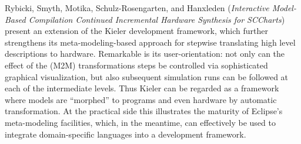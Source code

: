 



Rybicki, Smyth, Motika,
Schulz-Rosengarten, and Hanxleden
\cite{isola-2016-rybicki}
({\em Interactive Model-Based Compilation Continued
Incremental Hardware Synthesis for SCCharts})
present an extension of the Kieler development framework, which further strengthens its meta-modeling-based approach for stepwise translating high level descriptions to hardware. Remarkable is its user-orientation: not only can the effect of the (M2M) transformations steps be controlled via sophisticated graphical visualization, but also subsequent simulation runs can be followed at each of the intermediate levels. Thus Kieler can be regarded as a framework where models are ``morphed'' to programs and even hardware  by automatic transformation. 
At the practical side this illustrates the maturity of Eclipse's meta-modeling facilities, which, in the meantime, can effectively be used to integrate domain-specific languages into a development framework.

